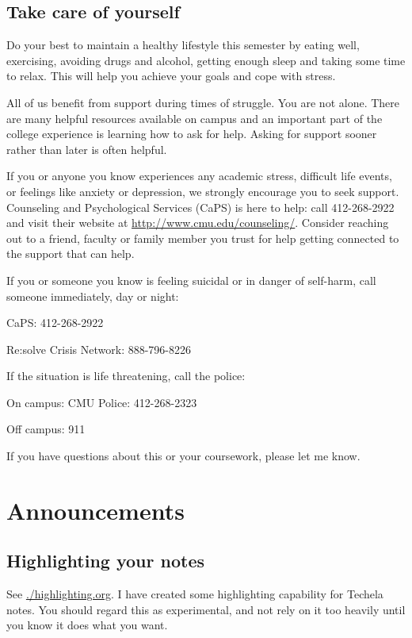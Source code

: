 \documentclass[11pt]{article}
\begin{document}
\subsection{Take care of yourself}
\label{sec:orgheadline13}
Do your best to maintain a healthy lifestyle this semester by eating well, exercising, avoiding drugs and alcohol, getting enough sleep and taking some time to relax. This will help you achieve your goals and cope with stress.

All of us benefit from support during times of struggle. You are not alone. There are many helpful resources available on campus and an important part of the college experience is learning how to ask for help. Asking for support sooner rather than later is often helpful.

If you or anyone you know experiences any academic stress, difficult life events, or feelings like anxiety or depression, we strongly encourage you to seek support. Counseling and Psychological Services (CaPS) is here to help: call 412-268-2922 and visit their website at \url{http://www.cmu.edu/counseling/}. Consider reaching out to a friend, faculty or family member you trust for help getting connected to the support that can help.

If you or someone you know is feeling suicidal or in danger of self-harm, call someone immediately, day or night:

CaPS: 412-268-2922

Re:solve Crisis Network: 888-796-8226

If the situation is life threatening, call the police:

On campus: CMU Police: 412-268-2323

Off campus: 911

If you have questions about this or your coursework, please let me know.

\section{Announcements}
\label{sec:orgheadline16}

\subsection{Highlighting your notes}
\label{sec:orgheadline15}

See \url{./highlighting.org}. I have created some highlighting capability for Techela notes. You should regard this as experimental, and not rely on it too heavily until you know it does what you want.
\end{document}
